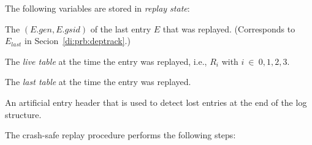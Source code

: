\documentclass[12pt,a4paper,twoside]{book}
\begin{document}
The following variables are stored in \textit{replay state}:
\begin{description}[noitemsep,leftmargin=1.5cm,labelindent=1cm]
    \item[$\mathbf{(gen_{last}, gsid_{last})}$] The $(E.gen, E.gsid)$ of the last entry $E$ that was replayed. (Corresponds to $E_{last}$ in Secion~\ref{di:prb:deptrack}.)
    \item[Live Table] The \textit{live table} at the time the entry was replayed, i.e., $R_i$ with $i~\in~{0,1,2,3}$.
    \item[Last Table] The \textit{last table} at the time the entry was replayed.
    \item[$E_{seal}$] An artificial entry header that is used to detect lost entries at the end of the log structure.
\end{description}
The crash-safe replay procedure performs the following steps:
\end{document}

